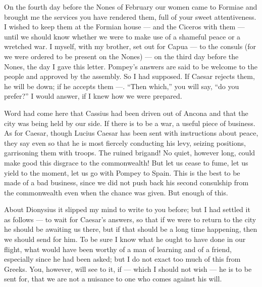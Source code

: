 

 On the fourth day before the Nones of February our women came to Formiae and brought me the services you have rendered them, full of your sweet attentiveness. I wished to keep them at the Formian house --- and the Ciceros with them --- until we should know whether we were to make use of a shameful peace or a wretched war. I myself, with my brother, set out for Capua --- to the consuls (for we were ordered to be present on the Nones) --- on the third day before the Nones, the day I gave this letter. Pompey's answers are said to be welcome to the people and approved by the assembly. So I had supposed. If Caesar rejects them, he will be down; if he accepts them ---. ``Then which,'' you will say, ``do you prefer?'' I would answer, if I knew how we were prepared.

 Word had come here that Cassius had been driven out of Ancona and that the city was being held by our side. If there is to be a war, a useful piece of business. As for Caesar, though Lucius Caesar has been sent with instructions about peace, they say even so that he is most fiercely conducting his levy, seizing positions, garrisoning them with troops. The ruined brigand! No quiet, however long, could make good this disgrace to the commonwealth! But let us cease to fume, let us yield to the moment, let us go with Pompey to Spain. This is the best to be made of a bad business, since we did not push back his second consulship from the commonwealth even when the chance was given. But enough of this.

 About Dionysius it slipped my mind to write to you before; but I had settled it as follows --- to wait for Caesar's answers, so that if we were to return to the city he should be awaiting us there, but if that should be a long time happening, then we should send for him. To be sure I know what he ought to have done in our flight, what would have been worthy of a man of learning and of a friend, especially since he had been asked; but I do not exact too much of this from Greeks. You, however, will see to it, if --- which I should not wish --- he is to be sent for, that we are not a nuisance to one who comes against his will.

